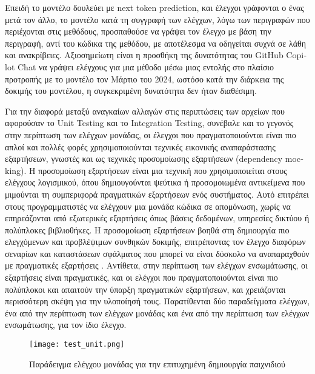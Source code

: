 Επειδή το μοντέλο δουλεύει με \textlatin{next token prediction}, και
έλεγχοι γράφονται ο ένας μετά τον άλλο, το μοντέλο κατά τη συγγραφή των
ελέγχων, λόγω των περιγραφών που περιέχονται στις μεθόδους, προσπαθούσε
να γράψει τον έλεγχο με βάση την περιγραφή, αντί του κώδικα της μεθόδου,
με αποτέλεσμα να οδηγείται συχνά σε λάθη και ανακρίβειες. Αξιοσημείωτη
είναι η προσθήκη της δυνατότητας του \textlatin{GitHub Copilot Chat} να
γράψει ελέγχους για μια μέθοδο μέσω μιας εντολής στο πλαίσιο προτροπής
με το μοντέλο \cite{copilotchattips} τον Μάρτιο του 2024, ωστόσο κατά
την διάρκεια της δοκιμής του μοντέλου, η συγκεκριμένη δυνατότητα δεν
ήταν διαθέσιμη.

Για την διαφορά μεταξύ αναγκαίων αλλαγών στις περιπτώσεις των αρχείων
που αφορούσαν το \textlatin{Unit Testing} και το \textlatin{Integration
  Testing}, συνέβαλε και το γεγονός στην περίπτωση των ελέγχων μονάδας,
οι έλεγχοι που πραγματοποιούνται είναι πιο απλοί και πολλές φορές
χρησιμοποιούνται τεχνικές εικονικής αναπαράστασης εξαρτήσεων, γνωστές
και ως τεχνικές προσομοίωσης εξαρτήσεων (\textlatin{dependency
  mocking}). Η προσομοίωση εξαρτήσεων είναι μια τεχνική που
χρησιμοποιείται στους ελέγχους λογισμικού, όπου δημιουγούνται ψεύτικα ή
προσομοιωμένα αντικείμενα που μιμούνται τη συμπεριφορά πραγματικών
εξαρτήσεων ενός συστήματος. Αυτό επιτρέπει στους προγραμματιστές να
ελέγχουν μια μονάδα κώδικα σε απομόνωση, χωρίς να επηρεάζονται από
εξωτερικές εξαρτήσεις όπως βάσεις δεδομένων, υπηρεσίες δικτύου ή
πολύπλοκες βιβλιοθήκες. Η προσομοίωση εξαρτήσεων βοηθά στη δημιουργία
πιο ελεγχόμενων και προβλέψιμων συνθηκών δοκιμής, επιτρέποντας τον
έλεγχο διαφόρων σεναρίων και καταστάσεων σφάλματος που μπορεί να είναι
δύσκολο να αναπαραχθούν με πραγματικές εξαρτήσεις
\cite{freeman2009growing}. Αντίθετα, στην περίπτωση των ελέγχων
ενσωμάτωσης, οι εξαρτήσεις είναι πραγματικές, και οι ελέγχοι που
πραγματοποιούνται είναι πιο πολύπλοκοι και απαιτούν την ύπαρξη
πραγματικών εξαρτήσεων, και χρειάζονται περισσότερη σκέψη για την
υλοποίησή τους. Παρατίθενται δύο παραδείγματα ελέγχων, ένα από την
περίπτωση των ελέγχων μονάδας και ένα από την περίπτωση των ελέγχων
ενσωμάτωσης, για τον ίδιο έλεγχο.

\begin{figure}[H]
  \begin{center}
    \texttt{[image: test\_unit.png]}
    \caption{Παράδειγμα ελέγχου μονάδας για την επιτυχημένη δημιουργία
      παιχνιδιού}
  \end{center}
  \label{fig:TestUnit}
\end{figure}

